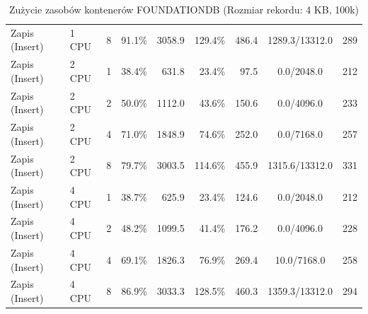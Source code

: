 \begin{table}[ht]
{\begin{tabular}{llcrrrrcc}
Zapis (Insert) & 1 CPU & 8 & 91.1\% & 3058.9 & 129.4\% & 486.4 & 1289.3/13312.0 & 289 \\
Zapis (Insert) & 2 CPU & 1 & 38.4\% & 631.8 & 23.4\% & 97.5 & 0.0/2048.0 & 212 \\
Zapis (Insert) & 2 CPU & 2 & 50.0\% & 1112.0 & 43.6\% & 150.6 & 0.0/4096.0 & 233 \\
Zapis (Insert) & 2 CPU & 4 & 71.0\% & 1848.9 & 74.6\% & 252.0 & 0.0/7168.0 & 257 \\
Zapis (Insert) & 2 CPU & 8 & 79.7\% & 3003.5 & 114.6\% & 455.9 & 1315.6/13312.0 & 331 \\
Zapis (Insert) & 4 CPU & 1 & 38.7\% & 625.9 & 23.4\% & 124.6 & 0.0/2048.0 & 212 \\
Zapis (Insert) & 4 CPU & 2 & 48.2\% & 1099.5 & 41.4\% & 176.2 & 0.0/4096.0 & 228 \\
Zapis (Insert) & 4 CPU & 4 & 69.1\% & 1826.3 & 76.9\% & 269.4 & 10.0/7168.0 & 258 \\
Zapis (Insert) & 4 CPU & 8 & 86.9\% & 3033.3 & 128.5\% & 460.3 & 1359.3/13312.0 & 294 \\
\bottomrule
\end{tabular}%
}
\caption{Zużycie zasobów kontenerów FOUNDATIONDB (Rozmiar rekordu: 4 KB, 100k)}
\label{tab:resources_foundationdb_medium_100000}
\end{table}
